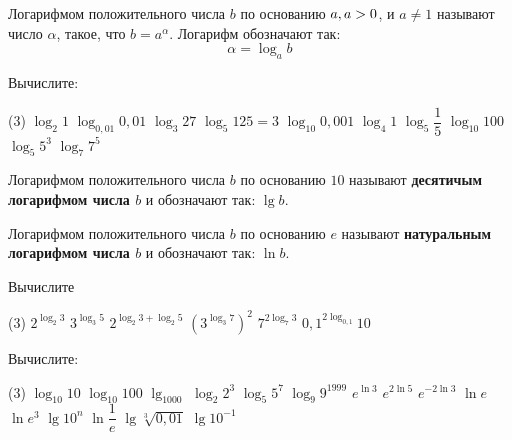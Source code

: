 %
%

\begin{class}[number=1]
	\begin{definit}
		Логарифмом положительного числа \(b\) по основанию \(a, \\ a>0 \), и \(a \neq 1\) называют число \( \alpha \), такое, что \(b=a^{\alpha}\). Логарифм обозначают так: \[ \alpha = \log_a b \]
	\end{definit}
	\begin{listofex}
		\item Вычислите:
		\begin{tasks}(3)
			\task \( \log_2 1 \)
			\task \( \log_{0,01} 0,01 \)
			\task \( \log_3 27 \)
			\task \( \log_5 125 =3 \)
			\task \( \log_10 0,001 \)
			\task \( \log_4 1 \)
			\task \( \log_5 \dfrac{1}{5} \)
			\task \( \log_{10} 100 \)
			\task \( \log_5 5^3 \)
			\task \( \log_7 7^5 \)
		\end{tasks}
	\end{listofex}
	\begin{definit}
		Логарифмом положительного числа \(b\) по основанию \(10\) называют \textbf{десятичым логарифмом числа \(b\)} и обозначают так: \( \lg b \).
	\end{definit}
	\begin{definit}
		Логарифмом положительного числа \(b\) по основанию \(e\) называют \textbf{натуральным логарифмом числа \(b\)} и обозначают так: \( \ln b \).
	\end{definit}
	\begin{listofex}[resume]
		\item Вычислите
		\begin{tasks}(3)
			\task \( 2^{\log_2 3} \)
			\task \( 3^{\log_3 5} \)
			\task \( 2^{\log_2 3 + \log_2 5} \)
			\task \( ( 3^{\log_3 7} )^2 \)
			\task \( 7^{2\log_7 3} \)
			\task \( 0,1^{2\log_{0,1}} 10 \)
		\end{tasks}
		\item Вычислите:
		\begin{tasks}(3)
			\task \( \log_{10} 10 \)
			\task \( \log_{10} 100 \)
			\task \( \lg_1000 \)
			\task \( \log_2 2^3 \)
			\task \( \log_5 5^7 \)
			\task \( \log_9 9^{1999} \)
			\task \( e^{\ln 3} \)
			\task \( e^{2\ln 5} \)
			\task \( e^{-2\ln 3} \)
			\task \( \ln e \)
			\task \( \ln e^3 \)
			\task \( \lg 10^n \)
			\task \( \ln \dfrac{1}{e} \)
			\task \( \lg \sqrt[3]{0,01} \)
			\task \( \lg 10^{-1} \)
		\end{tasks}
	\end{listofex}
\end{class}

